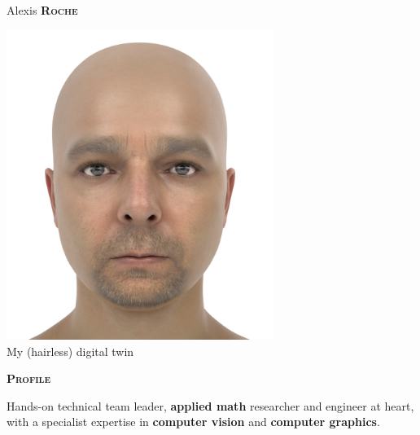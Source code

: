 \documentclass[11pt, a4paper]{article}
\newcommand{\headleft}[1]{\vspace*{3ex}\textsc{\textbf{#1}}\par%
    \vspace*{-1.5ex}\hrulefill\par\vspace*{0.7ex}}
\begin{document}
\setlength{\topskip}{0pt}
\setlength{\parindent}{0pt}
\setlength{\parskip}{0pt}
\setlength{\fboxsep}{0pt}
\pagestyle{empty}
\raggedbottom

\begin{minipage}[t]{0.33\textwidth} %
\colorbox{cvblue}{\begin{minipage}[t][5mm][t]{\textwidth}\null\hfill\null\end{minipage}}

\vspace{-.2ex} %
\colorbox{cvblue!90}{\color{white}  %
\textwidth\relax%
\begin{minipage}[t][293mm][t]{0.82\textwidth}
\raggedright
\vspace*{2.5ex}

\Large Alexis \textbf{\textsc{Roche}} \normalsize 

\null\hfill
\begin{center}
\includegraphics[width=0.65\textwidth]{alexis_didimo_cropped.png}\\
\caption{\scriptsize My (hairless) digital twin}
\end{center}
\hfill\null

\vspace*{0.5ex} %

\headleft{Profile}
 Hands-on technical team leader, {\bf applied math} researcher and engineer at heart, with a specialist expertise in {\bf computer vision} and {\bf computer graphics}. 


\end{minipage}}
\end{minipage}
\end{document}
